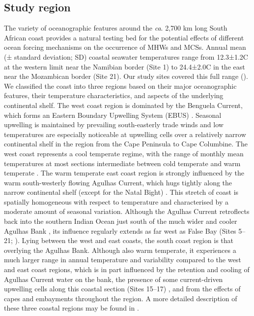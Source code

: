 \documentclass[a4paper,10pt,review]{elsarticle}
\begin{document}
\subsection{Study region}
The variety of oceanographic features around the \emph{ca}. 2,700 km long South African coast provides a natural testing bed for the potential effects of different ocean forcing mechanisms on the occurrence of MHWs and MCSs. Annual mean (± standard deviation; SD) coastal seawater temperatures range from 12.3±1.2\degree C at the western limit near the Namibian border (Site 1) to 24.4±2.0\degree C in the east near the Mozambican border (Site 21). Our study sites covered this full range (). We classified the coast into three regions based on their major oceanographic features, their temperature characteristics, and aspects of the underlying continental shelf. The west coast region is dominated by the Benguela Current, which forms an Eastern Boundary Upwelling System (EBUS) \citep{Hutchings2009}. Seasonal upwelling is maintained by prevailing south-easterly trade winds and low temperatures are especially noticeable at upwelling cells over a relatively narrow continental shelf in the region from the Cape Peninsula to Cape Columbine. The west coast represents a cool temperate regime, with the range of monthly mean temperatures at most sections intermediate between cold temperate and warm temperate \citep{Luning1990}. The warm temperate east coast region is strongly influenced by the warm south-westerly flowing Agulhas Current, which hugs tightly along the narrow continental shelf (except for the Natal Bight) \citep{Luning1990}. This stretch of coast is spatially homogeneous with respect to temperature and characterised by a moderate amount of seasonal variation. Although the Agulhas Current retroflects back into the southern Indian Ocean \citep{Hutchings2009} just south of the much wider and cooler Agulhas Bank \citep{Roberts2005}, its influence regularly extends as far west as False Bay (Sites 5--21; ). Lying between the west and east coasts, the south coast region is that overlying the Agulhas Bank. Although also warm temperate, it experiences a much larger range in annual temperature and variability compared to the west and east coast regions, which is in part influenced by the retention and cooling of Agulhas Current water on the bank, the presence of some current-driven upwelling cells along this coastal section (Sites 15--17) \citep{Roberts2005}, and from the effects of capes and embayments throughout the region. A more detailed description of these three coastal regions may be found in \citet{Smit2013}.
\end{document}
